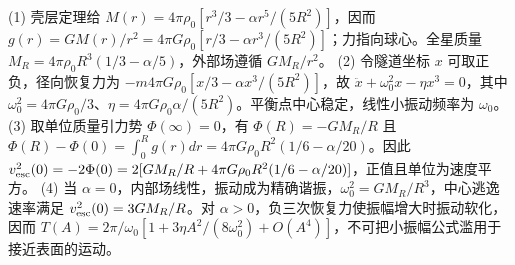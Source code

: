 (1) 壳层定理给 \(M(r)=4\pi\rho_0[r^3/3-\alpha r^5/(5R^2)]\)，因而 \(g(r)=GM(r)/r^2=4\pi G\rho_0[r/3-\alpha r^3/(5R^2)]\)；力指向球心。全星质量 \(M_R=4\pi\rho_0R^3(1/3-\alpha/5)\)，外部场遵循 \(GM_R/r^2\)。
(2) 令隧道坐标 \(x\) 可取正负，径向恢复力为 \(-m4\pi G\rho_0[x/3-\alpha x^3/(5R^2)]\)，故 \(\ddot x+\omega_0^2x-\eta x^3=0\)，其中 \(\omega_0^2=4\pi G\rho_0/3\)、\(\eta=4\pi G\rho_0\alpha/(5R^2)\)。平衡点中心稳定，线性小振动频率为 \(\omega_0\)。
(3) 取单位质量引力势 \(\Phi(\infty)=0\)，有 \(\Phi(R)=-GM_R/R\) 且 \(\Phi(R)-\Phi(0)=\int_0^R g(r)dr=4\pi G\rho_0R^2(1/6-\alpha/20)\)。因此 \(v_{\rm esc}^2(0)=-2\Phi(0)=2[GM_R/R+4\pi G\rho_0R^2(1/6-\alpha/20)]\)，正值且单位为速度平方。
(4) 当 \(\alpha=0\)，内部场线性，振动成为精确谐振，\(\omega_0^2=GM_R/R^3\)，中心逃逸速率满足 \(v_{\rm esc}^2(0)=3GM_R/R\)。对 \(\alpha>0\)，负三次恢复力使振幅增大时振动软化，因而 \(T(A)=2\pi/\omega_0[1+3\eta A^2/(8\omega_0^2)+O(A^4)]\)，不可把小振幅公式滥用于接近表面的运动。
